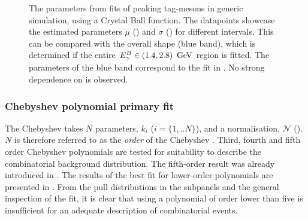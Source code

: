 \begin{figure}[htbp!]
    \centering
    \caption{\label{fig:crystal_ball_par_test}The parameters from \Mbc fits of peaking tag-\B mesons in generic \BB simulation, using a Crystal Ball function.
    The datapoints showcase the estimated parameters $\mu$ () and $\sigma$ () for different
    \EB intervals.
    This can be compared with the overall shape (blue band), which is determined if the entire ${E^B_{\gamma}}\in(1.4,2.8)~\mathrm{\,Ge\kern -0.1em V}$ region is fitted.
    The parameters of the blue band correspond to the fit in .
    No strong dependence on \EB is observed.
    }
\end{figure}

\subsubsection{Chebyshev polynomial primary fit}\label{sec:chebyshev_prefit}

The Chebyshev \PDF takes $N$ parameters, $k_i$ ($i=\{1,..N\}$), and a normalisation, $\mathcal{N}$ ().
$N$ is therefore referred to as the \textit{order} of the Chebyshev \PDF.
Third, fourth and fifth order Chebyshev polynomials are tested for suitability to describe the combinatorial \BB background distribution.
The fifth-order result was already introduced in .
The results of the best fit for lower-order polynomials are presented in .
From the pull distributions in the subpanels and the general inspection of the fit, it is clear that using a polynomial of order lower than five is insufficient for an adequate description of combinatorial \BB events.

